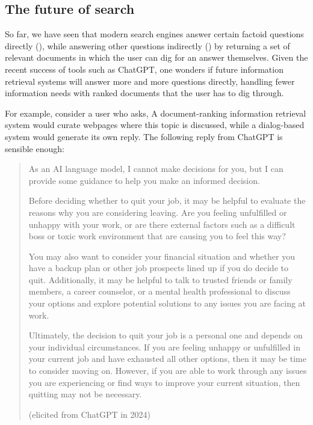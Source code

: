 \subsection{The future of search}
 
So far, we have seen that modern search engines answer certain factoid questions directly   (), while answering other questions indirectly  () by returning a set of relevant documents in which the user can dig for an answer themselves.  Given the recent success of tools such as ChatGPT, one wonders if future information retrieval systems will answer more and more questions directly, handling fewer information needs with ranked documents that the user has to dig through.  

For example, consider a user who asks,  A document-ranking information retrieval system would curate webpages where this topic is discussed, while a dialog-based system would generate its own reply.  The following reply from ChatGPT is sensible enough: 

\begin{quote}

As an AI language model, I cannot make decisions for you, but I can provide some guidance to help you make an informed decision.

Before deciding whether to quit your job, it may be helpful to evaluate the reasons why you are considering leaving. Are you feeling unfulfilled or unhappy with your work, or are there external factors such as a difficult boss or toxic work environment that are causing you to feel this way?

You may also want to consider your financial situation and whether you have a backup plan or other job prospects lined up if you do decide to quit. Additionally, it may be helpful to talk to trusted friends or family members, a career counselor, or a mental health professional to discuss your options and explore potential solutions to any issues you are facing at work.

Ultimately, the decision to quit your job is a personal one and depends on your individual circumstances. If you are feeling unhappy or unfulfilled in your current job and have exhausted all other options, then it may be time to consider moving on. However, if you are able to work through any issues you are experiencing or find ways to improve your current situation, then quitting may not be necessary.

\hfill (elicited from ChatGPT in 2024)

\end{quote}

